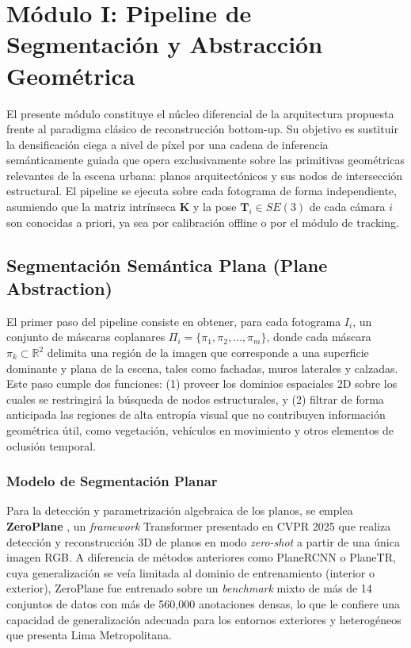 \chapter{Módulo I: Pipeline de Segmentación y Abstracción Geométrica}

El presente módulo constituye el núcleo diferencial de la arquitectura propuesta frente al paradigma clásico de reconstrucción bottom-up. Su objetivo es sustituir la densificación ciega a nivel de píxel por una cadena de inferencia semánticamente guiada que opera exclusivamente sobre las primitivas geométricas relevantes de la escena urbana: planos arquitectónicos y sus nodos de intersección estructural. El pipeline se ejecuta sobre cada fotograma de forma independiente, asumiendo que la matriz intrínseca $\mathbf{K}$ y la pose $\mathbf{T}_i \in SE(3)$ de cada cámara $i$ son conocidas a priori, ya sea por calibración offline o por el módulo de tracking.

\section{Segmentación Semántica Plana (Plane Abstraction)}

El primer paso del pipeline consiste en obtener, para cada fotograma $I_i$, un conjunto de máscaras coplanares $\Pi_i = \{\pi_1, \pi_2, \ldots, \pi_m\}$, donde cada máscara $\pi_k \subset \mathbb{R}^2$ delimita una región de la imagen que corresponde a una superficie dominante y plana de la escena, tales como fachadas, muros laterales y calzadas. Este paso cumple dos funciones: (1) proveer los dominios espaciales 2D sobre los cuales se restringirá la búsqueda de nodos estructurales, y (2) filtrar de forma anticipada las regiones de alta entropía visual que no contribuyen información geométrica útil, como vegetación, vehículos en movimiento y otros elementos de oclusión temporal.

\subsection{Modelo de Segmentación Planar}
 
Para la detección y parametrización algebraica de los planos, se emplea \textbf{ZeroPlane} \cite{liu2025zeroplane}, un \textit{framework} Transformer presentado en CVPR 2025 que realiza detección y reconstrucción 3D de planos en modo \textit{zero-shot} a partir de una única imagen RGB. A diferencia de métodos anteriores como PlaneRCNN o PlaneTR, cuya generalización se veía limitada al dominio de entrenamiento (interior o exterior), ZeroPlane fue entrenado sobre un \textit{benchmark} mixto de más de 14 conjuntos de datos con más de 560{,}000 anotaciones densas, lo que le confiere una capacidad de generalización adecuada para los entornos exteriores y heterogéneos que presenta Lima Metropolitana.
 
